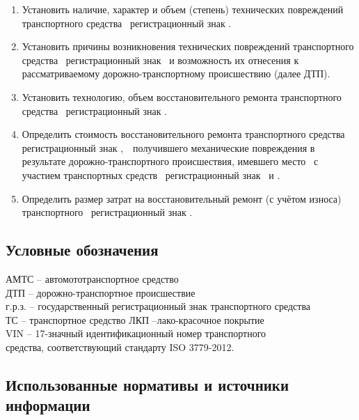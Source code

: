 \begin{enumerate}
\item  Установить наличие, характер и объем (степень) технических повреждений транспортного средства  \tc\, регистрационный знак .
\item  Установить причины возникновения технических повреждений транспортного средства \, регистрационный знак \, и возможность их отнесения к рассматриваемому дорожно-транспортному происшествию (далее ДТП).
\item  Установить технологию, объем восстановительного  ремонта транспортного средства \tc\, регистрационный знак .
\item  Определить стоимость восстановительного ремонта  транспортного средства \tc\, регистрационный знак ,\, \, получившего механические повреждения в результате дорожно-транспортного происшествия, имевшего место \, с участием транспортных средств \, регистрационный знак \, и \tca.
\item Определить размер затрат на восстановительный ремонт (с учётом износа) транспортного  \, регистрационный знак .
\end{enumerate}
\subsection{Условные обозначения}

\noindent АМТС – автомототранспортное средство\\
ДТП – дорожно-транспортное происшествие\\
г.р.з. – государственный регистрационный знак транспортного средства\\
ТС – транспортное средство
ЛКП –лако-красочное покрытие\\
VIN – 17-значный идентификационный номер транспортного\\ средства, соответствующий стандарту ISO 3779-2012. 


\subsection{Использованные нормативы и источники информации}

